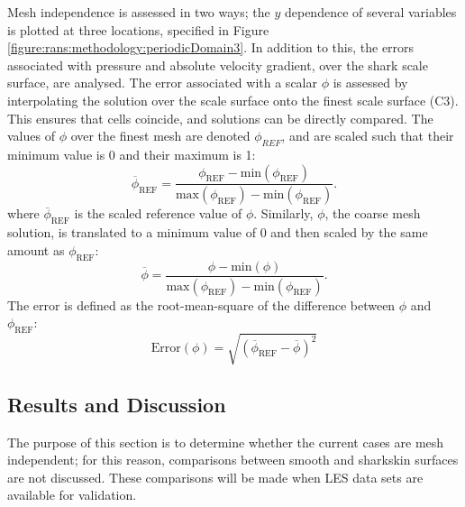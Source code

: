 \documentclass[12pt,oneside,a4paper]{article}
\begin{document}
Mesh independence is assessed in two ways; the $y$ dependence of several variables is plotted at three locations, specified in Figure \ref{figure:rans:methodology:periodicDomain3}. In addition to this, the errors associated with pressure and absolute velocity gradient, over the shark scale surface, are analysed. The error associated with a scalar $\phi$ is assessed by interpolating the solution over the scale surface onto the finest scale surface (C3). This ensures that cells coincide, and solutions can be directly compared. The values of $\phi$ over the finest mesh are denoted $\phi_{REF}$, and are scaled such that their minimum value is 0 and their maximum is 1:
\begin{equation}
\label{equation:rans:error1}
\overline{\phi}_{\text{REF}} = \frac{\phi_{\text{REF}}-\text{min}(\phi_{\text{REF}})}{\text{max}(\phi_{\text{REF}})-\text{min}(\phi_{\text{REF}})}.
\end{equation}
where $\overline{\phi}_{\text{REF}}$ is the scaled reference value of $\phi$. Similarly, $\phi$, the coarse mesh solution, is translated to a minimum value of 0 and then scaled by the same amount as $\phi_{\text{REF}}$:
\begin{equation}
\overline{\phi} = \frac{\phi-\text{min}(\phi)}{\text{max}(\phi_{\text{REF}})-\text{min}(\phi_{\text{REF}})}.
\end{equation}
The error is defined as the root-mean-square of the difference between $\phi$ and $\phi_{\text{REF}}$:
\begin{equation}
\label{equation:rans:error2}
\text{Error}(\phi) = \sqrt{(\overline{\phi}_{\text{REF}} - \overline{\phi})^2}
\end{equation}

\subsection{Results and Discussion}
\label{section:rans:results}
The purpose of this section is to determine whether the current cases are mesh independent; for this reason, comparisons between smooth and sharkskin surfaces are not discussed. These comparisons will be made when LES data sets are available for validation.
\end{document}
